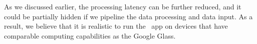 As we discussed earlier, the processing latency can be further reduced, and it could be partially hidden if we pipeline the data processing and data input. As a result, we believe that it is realistic to run the \systemname~app on devices that have comparable computing capabilities as the Google Glass.
